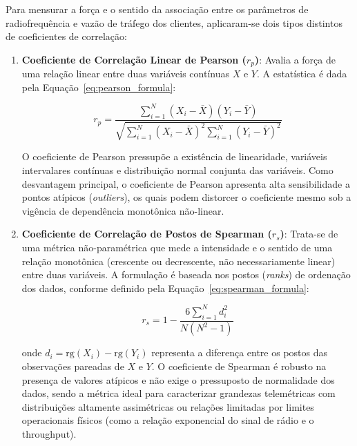 Para mensurar a força e o sentido da associação entre os parâmetros de radiofrequência e vazão de tráfego dos clientes, aplicaram-se dois tipos distintos de coeficientes de correlação:

\begin{enumerate}
    \item \textbf{Coeficiente de Correlação Linear de Pearson ($r_p$)}: Avalia a força de uma relação linear entre duas variáveis contínuas $X$ e $Y$. A estatística é dada pela Equação~\ref{eq:pearson_formula}:
    
    \begin{equation}
    \label{eq:pearson_formula}
    r_p = \frac{\sum_{i=1}^{N} (X_i - \bar{X})(Y_i - \bar{Y})}{\sqrt{\sum_{i=1}^{N} (X_i - \bar{X})^2 \sum_{i=1}^{N} (Y_i - \bar{Y})^2}}
    \end{equation}
    
    O coeficiente de Pearson pressupõe a existência de linearidade, variáveis intervalares contínuas e distribuição normal conjunta das variáveis. Como desvantagem principal, o coeficiente de Pearson apresenta alta sensibilidade a pontos atípicos (\textit{outliers}), os quais podem distorcer o coeficiente mesmo sob a vigência de dependência monotônica não-linear.

    \item \textbf{Coeficiente de Correlação de Postos de Spearman ($r_s$)}: Trata-se de uma métrica não-paramétrica que mede a intensidade e o sentido de uma relação monotônica (crescente ou decrescente, não necessariamente linear) entre duas variáveis. A formulação é baseada nos postos (\textit{ranks}) de ordenação dos dados, conforme definido pela Equação~\ref{eq:spearman_formula}:
    
    \begin{equation}
    \label{eq:spearman_formula}
    r_s = 1 - \frac{6 \sum_{i=1}^{N} d_i^2}{N(N^2 - 1)}
    \end{equation}
    
    onde $d_i = \mathrm{rg}(X_i) - \mathrm{rg}(Y_i)$ representa a diferença entre os postos das observações pareadas de $X$ e $Y$. O coeficiente de Spearman é robusto na presença de valores atípicos e não exige o pressuposto de normalidade dos dados, sendo a métrica ideal para caracterizar grandezas telemétricas com distribuições altamente assimétricas ou relações limitadas por limites operacionais físicos (como a relação exponencial do sinal de rádio e o throughput).
\end{enumerate}

